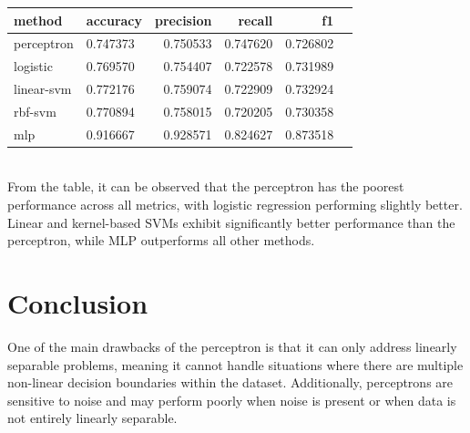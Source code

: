 \documentclass[10pt,twocolumn,letterpaper]{article}
\begin{document}
\begin{tabular}{llrrrr}
	\toprule
	method     & accuracy & precision & recall   & f1       \\
	\midrule
	perceptron & 0.747373 & 0.750533  & 0.747620 & 0.726802 \\
	logistic   & 0.769570 & 0.754407  & 0.722578 & 0.731989 \\
	linear-svm & 0.772176 & 0.759074  & 0.722909 & 0.732924 \\
	rbf-svm    & 0.770894 & 0.758015  & 0.720205 & 0.730358 \\
	mlp        & 0.916667 & 0.928571  & 0.824627 & 0.873518 \\
	\bottomrule
\end{tabular}
~\\
\indent From the table, it can be observed that the perceptron has the poorest performance across all metrics, with logistic regression performing slightly better. Linear and kernel-based SVMs exhibit significantly better performance than the perceptron, while MLP outperforms all other methods.

\section{Conclusion}
One of the main drawbacks of the perceptron is that it can only address linearly separable problems, meaning it cannot handle situations where there are multiple non-linear decision boundaries within the dataset. Additionally, perceptrons are sensitive to noise and may perform poorly when noise is present or when data is not entirely linearly separable.

	{\small
		
		
	}
\end{document}
